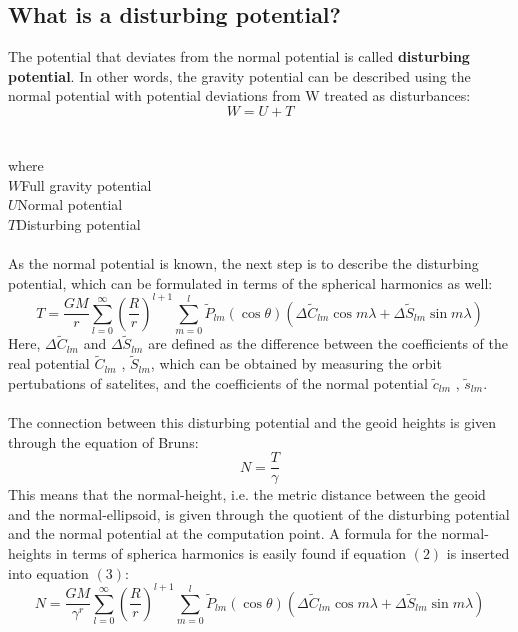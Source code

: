 \documentclass[a4paper,12pt]{article}
\newcommand\tab[1][1cm]{\hspace*{#1}}
\begin{document}
\subsection{What is a disturbing potential?}
The potential that deviates from the normal potential is called \textbf{disturbing potential}. In other words, the gravity potential can be described using the normal potential with
potential deviations from W treated as disturbances:
\begin{equation} 
W=U+T
\end{equation}
\\\\where
\\$W$\tab Full gravity potential
\\$U$\tab Normal potential
\\$T$\tab Disturbing potential
\\\\As the normal potential is known, the next step is to describe the disturbing potential, which can be formulated in terms of the spherical harmonics as well:
\begin{equation}
T=\frac{GM}{r}\sum_{l=0}^{\infty} \left(\frac{R}{r}\right)^{l+1}\sum_{m=0}^{l} \widetilde{P}_{lm}(\cos\theta)(\Delta\widetilde{C}_{lm}\cos m\lambda + \Delta\widetilde{S}_{lm}\sin m\lambda)
\end{equation}
Here, $\Delta\widetilde{C}_{lm}$ and $\Delta\widetilde{S}_{lm}$ are defined as the difference between the coefficients of the real potential $\widetilde{C}_{lm}$ , $\widetilde{S}_{lm}$, which can be obtained by measuring the orbit pertubations of satelites, and the coefficients of the normal potential $\widetilde{c}_{lm}$ , $	\widetilde{s}_{lm}$.
\\\\The connection between this disturbing potential and the geoid heights is given through the equation of Bruns:
\begin{equation}
N=\frac{T}{\gamma}
\end{equation}
This means that the normal-height, i.e. the metric distance between the geoid and
the normal-ellipsoid, is given through the quotient of the disturbing potential and the
normal potential at the computation point. A formula for the normal-heights in terms
of spherica harmonics is easily found if equation $(2)$ is inserted into equation $(3)$:
\begin{equation}
N=\frac{GM}{\gamma^r}\sum_{l=0}^{\infty} \left(\frac{R}{r}\right)^{l+1}\sum_{m=0}^{l} \widetilde{P}_{lm}(\cos\theta)(\Delta\widetilde{C}_{lm}\cos m\lambda + \Delta\widetilde{S}_{lm}\sin m\lambda)
\end{equation}
\end{document}

